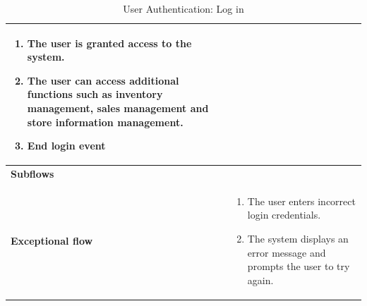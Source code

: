 \documentclass[../thesis.tex]{subfiles}
\begin{document}
\begin{center}
\begin{table}[H]
{\begin{tabular}[htbp]{|p{}|p{}|}
\begin{enumerate}
                                                       \item  The user is granted access to the system.
                                                       \item The user can access additional functions such as inventory management, sales management and store information management.
                                                       \item End login event
                                                   \end{enumerate} \\ \hline
                \textbf{Subflows              }  &                                                                                                                                \\ \hline
                \textbf{Exceptional flow       } & \begin{enumerate}
                                                       \item The user enters incorrect login credentials.
                                                       \item The system displays an error message and prompts the user to try again.
                                                   \end{enumerate}                                                   \\ \hline
            \end{tabular}%
        }
        \caption{User Authentication: Log in}
        \label{tab:table-usecase-user-login}


    \end{table}
\end{center}
\end{document}
